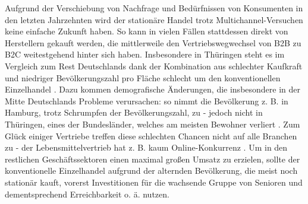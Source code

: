 \documentclass[a4paper, 12pt]{scrartcl}
\makeatletter
\newenvironment{folding}{\endgroup}{\begingroup \def \@currenvir{folding}\edef \@currenvline{\on@line}}
\makeatother
\begin{document}
\begin{folding} %

Aufgrund der Verschiebung von Nachfrage und Bedürfnissen von Konsumenten in den letzten Jahrzehnten wird der stationäre Handel trotz Multichannel-Versuchen keine einfache Zukunft haben. So kann in vielen Fällen stattdessen direkt von Herstellern gekauft werden, die mittlerweile den Vertriebswegwechsel von \ac{B2B} zu \ac{B2C} weitestgehend hinter sich haben. 
Insbesondere in Thüringen steht es im Vergleich zum Rest Deutschlands dank der Kombination aus schlechter Kaufkraft und niedriger Bevölkerungszahl pro Fläche schlecht um den konventionellen Einzelhandel \cite[S. 29]{Nitt}. Dazu kommen demografische Änderungen, die insbesondere in der Mitte Deutschlands Probleme verursachen: so nimmt die Bevölkerung z. B. in Hamburg, trotz Schrumpfen der Bevölkerungszahl, zu - jedoch nicht in Thüringen, eines der Bundesländer, welches am meisten Bewohner verliert \cite[S. 32f]{Nitt}. 
Zum Glück einiger Vertriebe treffen diese schlechten Chancen nicht auf alle Branchen zu - der Lebensmittelvertrieb hat z. B. kaum Online-Konkurrenz \cite{corona-schub}. Um in den restlichen Geschäftssektoren einen maximal großen Umsatz zu erzielen, sollte der konventionelle Einzelhandel aufgrund der alternden Bevölkerung, die meist noch stationär kauft, vorerst Investitionen für die wachsende Gruppe von Senioren und dementsprechend Erreichbarkeit o. ä. nutzen.

\end{folding}
\end{document}
